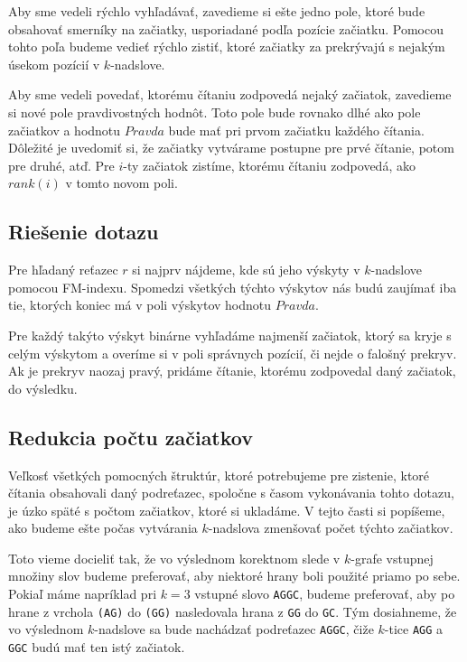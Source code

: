 Aby sme vedeli rýchlo vyhľadávať, zavedieme si ešte jedno pole, ktoré bude
obsahovať smerníky na začiatky, usporiadané podľa pozície začiatku. Pomocou
tohto poľa budeme vedieť rýchlo zistiť, ktoré začiatky za prekrývajú
s nejakým úsekom pozícií v $k$-nadslove.

Aby sme vedeli povedať, ktorému čítaniu zodpovedá nejaký začiatok, zavedieme
si nové pole pravdivostných hodnôt. Toto pole bude rovnako dlhé ako pole začiatkov
a hodnotu $Pravda$ bude mať pri prvom začiatku každého čítania. Dôležité je uvedomiť
si, že začiatky vytvárame postupne pre prvé čítanie, potom pre druhé, atď.
Pre $i$-ty začiatok zistíme, ktorému čítaniu zodpovedá, ako $rank(i)$ v tomto novom poli.

\subsection{Riešenie dotazu}

Pre hľadaný reťazec $r$ si najprv nájdeme, kde sú jeho výskyty v $k$-nadslove
pomocou FM-indexu. Spomedzi všetkých týchto výskytov nás budú zaujímať iba tie,
ktorých koniec má v poli výskytov hodnotu $Pravda$.

Pre každý takýto výskyt binárne vyhľadáme najmenší začiatok, ktorý sa kryje s celým
výskytom a overíme si v poli správnych pozícií, či nejde o falošný prekryv.
Ak je prekryv naozaj pravý, pridáme čítanie, ktorému zodpovedal daný začiatok,
do výsledku.

\subsection{Redukcia počtu začiatkov}

Veľkosť všetkých pomocných štruktúr, ktoré potrebujeme pre zistenie, ktoré
čítania obsahovali daný podreťazec, spoločne s časom vykonávania tohto
dotazu, je úzko späté s počtom začiatkov, ktoré si ukladáme. V tejto
časti si popíšeme, ako budeme ešte počas vytvárania $k$-nadslova zmenšovať
počet týchto začiatkov.

Toto vieme docieliť tak, že vo výslednom korektnom slede v $k$-grafe vstupnej
množiny slov budeme preferovať, aby niektoré hrany boli použité priamo po sebe.
Pokiaľ máme napríklad pri $k = 3$ vstupné slovo \verb_AGGC_, budeme preferovať,
aby po hrane z vrchola \verb_(AG)_ do \verb_(GG)_ nasledovala hrana z \verb_GG_
do \verb_GC_. Tým dosiahneme, že vo výslednom $k$-nadslove sa bude nachádzať
podreťazec \verb_AGGC_, čiže $k$-tice \verb_AGG_ a \verb_GGC_ budú mať ten istý
začiatok.

